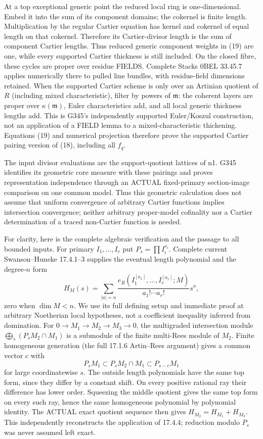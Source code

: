 \documentclass[11pt]{article}
\begin{document}
At a top exceptional generic point the reduced local ring is one-dimensional. Embed it into the sum of its component domains; the cokernel is finite length. Multiplication by the regular Cartier equation has kernel and cokernel of equal length on that cokernel. Therefore its Cartier-divisor length is the sum of component Cartier lengths. Thus reduced generic component weights in (19) are one, while every supported Cartier thickness is still included. On the closed fibre, these cycles are proper over residue FIELDS. Complete Stacks 0BEL 33.45.7 applies numerically there to pulled line bundles, with residue-field dimensions retained. When the supported Cartier scheme is only over an Artinian quotient of $R$ (including mixed characteristic), filter by powers of $\mathfrak m$: the coherent layers are proper over $\kappa(\mathfrak m)$, Euler characteristics add, and all local generic thickness lengths add. This is G345's independently supported Euler/Koszul construction, not an application of a FIELD lemma to a mixed-characteristic thickening. Equations (19) and numerical projection therefore prove the supported Cartier pairing version of (18), including all $f_q$.

The input divisor evaluations are the support-quotient lattices of n1. G345 identifies its geometric core measure with these pairings and proves representation independence through an ACTUAL fixed-primary section-image comparison on one common model. Thus this geometric calculation does not assume that uniform convergence of arbitrary Cartier functions implies intersection convergence; neither arbitrary proper-model cofinality nor a Cartier determination of a traced non-Cartier function is needed.

For clarity, here is the complete algebraic verification and the passage to all bounded inputs. For primary $I_1,\ldots,I_r$ put $P_s=\prod I_i^{s_i}$. Complete current Swanson--Huneke 17.4.1--3 supplies the eventual length polynomial and the degree-$n$ form
\[
H_M(s)=\sum_{|a|=n}\frac{e_R(I_1^{[a_1]},\ldots,I_r^{[a_r]};M)}{a_1!\cdots a_r!}s^a,
\]
zero when $\dim M<n$. We use its full defining setup and immediate proof at arbitrary Noetherian local hypotheses, not a coefficient inequality inferred from domination. For $0\to M_1\to M_2\to M_3\to0$, the multigraded intersection module
$\bigoplus_s(P_sM_2\cap M_1)$ is a submodule of the finite multi-Rees module of $M_2$. Finite homogeneous generation (the full 17.1.6 Artin--Rees argument) gives a common vector $c$ with
\[
P_sM_1\subset P_sM_2\cap M_1\subset P_{s-c}M_1
\]
for large coordinatewise $s$. The outside length polynomials have the same top form, since they differ by a constant shift. On every positive rational ray their difference has lower order. Squeezing the middle quotient gives the same top form on every such ray, hence the same homogeneous polynomial by polynomial identity. The ACTUAL exact quotient sequence then gives $H_{M_2}=H_{M_1}+H_{M_3}$. This independently reconstructs the application of 17.4.4; reduction modulo $P_s$ was never assumed left exact.
\end{document}
